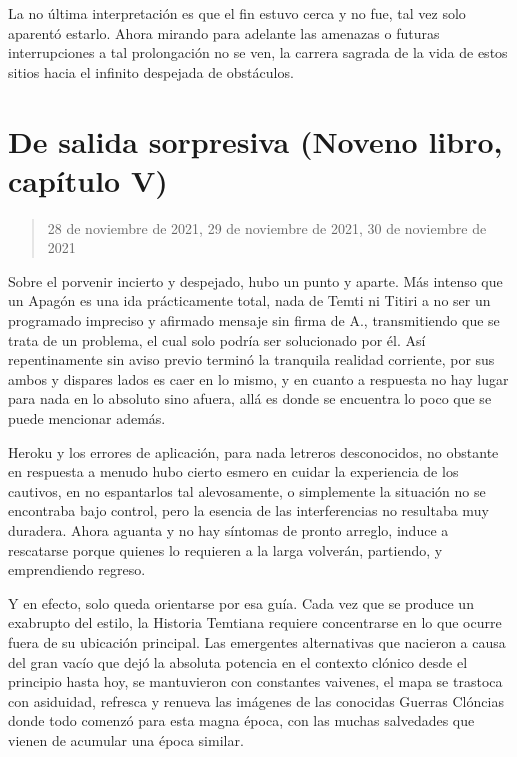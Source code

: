 \documentclass[
  spanish,
]{book}
\begin{document}
La no última interpretación es que el fin estuvo cerca y no fue, tal vez solo aparentó estarlo. Ahora mirando para adelante las amenazas o futuras interrupciones a tal prolongación no se ven, la carrera sagrada de la vida de estos sitios hacia el infinito despejada de obstáculos.

\hypertarget{de-salida-sorpresiva-noveno-libro-capuxedtulo-v}{%
\section{De salida sorpresiva (Noveno libro, capítulo V)}\label{de-salida-sorpresiva-noveno-libro-capuxedtulo-v}}

\begin{quote}
28 de noviembre de 2021, 29 de noviembre de 2021, 30 de noviembre de 2021
\end{quote}

Sobre el porvenir incierto y despejado, hubo un punto y aparte. Más intenso que un Apagón es una ida prácticamente total, nada de Temti ni Titiri a no ser un programado impreciso y afirmado mensaje sin firma de A., transmitiendo que se trata de un problema, el cual solo podría ser solucionado por él. Así repentinamente sin aviso previo terminó la tranquila realidad corriente, por sus ambos y dispares lados es caer en lo mismo, y en cuanto a respuesta no hay lugar para nada en lo absoluto sino afuera, allá es donde se encuentra lo poco que se puede mencionar además.

Heroku y los errores de aplicación, para nada letreros desconocidos, no obstante en respuesta a menudo hubo cierto esmero en cuidar la experiencia de los cautivos, en no espantarlos tal alevosamente, o simplemente la situación no se encontraba bajo control, pero la esencia de las interferencias no resultaba muy duradera. Ahora aguanta y no hay síntomas de pronto arreglo, induce a rescatarse porque quienes lo requieren a la larga volverán, partiendo, y emprendiendo regreso.

Y en efecto, solo queda orientarse por esa guía. Cada vez que se produce un exabrupto del estilo, la Historia Temtiana requiere concentrarse en lo que ocurre fuera de su ubicación principal. Las emergentes alternativas que nacieron a causa del gran vacío que dejó la absoluta potencia en el contexto clónico desde el principio hasta hoy, se mantuvieron con constantes vaivenes, el mapa se trastoca con asiduidad, refresca y renueva las imágenes de las conocidas Guerras Clóncias donde todo comenzó para esta magna época, con las muchas salvedades que vienen de acumular una época similar.
\end{document}
